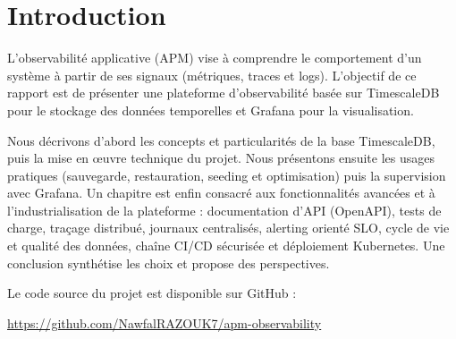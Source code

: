 \section{Introduction}

L’observabilité applicative (APM) vise à comprendre le comportement d’un système à partir de ses signaux (métriques, traces et logs). L’objectif de ce rapport est de présenter une plateforme d’observabilité basée sur TimescaleDB pour le stockage des données temporelles et Grafana pour la visualisation.

Nous décrivons d’abord les concepts et particularités de la base TimescaleDB, puis la mise en œuvre technique du projet. Nous présentons ensuite les usages pratiques (sauvegarde, restauration, seeding et optimisation) puis la supervision avec Grafana. Un chapitre est enfin consacré aux fonctionnalités avancées et à l’industrialisation de la plateforme : documentation d’API (OpenAPI), tests de charge, traçage distribué, journaux centralisés, alerting orienté SLO, cycle de vie et qualité des données, chaîne CI/CD sécurisée et déploiement Kubernetes. Une conclusion synthétise les choix et propose des perspectives.

Le code source du projet est disponible sur GitHub :
\par\noindent\url{https://github.com/NawfalRAZOUK7/apm-observability}
